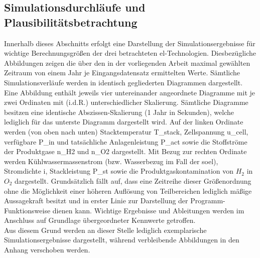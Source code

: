\documentclass[onecolumn,10pt,titlepage]{article}
\begin{document}
\subsection{Simulationsdurchläufe und Plausibilitätsbetrachtung}
Innerhalb dieses Abschnitts erfolgt eine Darstellung der Simulationsergebnisse für wichtige Berechnungsgrößen der drei betrachteten \gls{el}-Technologien. Diesbezügliche Abbildungen zeigen die über den in der vorliegenden Arbeit maximal gewählten Zeitraum von einem Jahr je Eingangsdatensatz ermittelten Werte. %
Sämtliche Simulationsverläufe werden in identisch gegliederten Diagrammen dargestellt. Eine Abbildung enthält jeweils vier untereinander angeordnete Diagramme mit je zwei Ordinaten mit (i.d.R.) unterschiedlicher Skalierung. Sämtliche Diagramme besitzen eine identische Abszissen-Skalierung (1 Jahr in Sekunden), welche lediglich für das unterste Diagramm dargestellt wird. Auf der linken Ordinate werden (von oben nach unten) Stacktemperatur \gls{T_stack}, Zellspannung \gls{u_cell}, verfügbare \gls{P_in} und tatsächliche Anlagenleistung \gls{P_act} sowie die Stoffströme der Produktgase \gls{n_H2} und \gls{n_O2} dargestellt.
Mit Bezug zur rechten Ordinate werden Kühlwassermassenstrom (bzw. Wasserbezug im Fall der \gls{soel}), Stromdichte \gls{i}, Stackleistung \gls{P_st} sowie die Produktgaskontamination von $H_2$ in $O_2$ dargestellt.
Grundsätzlich fällt auf, dass eine Zeitreihe dieser Größenordnung ohne die Möglichkeit einer höheren Auflösung von Teilbereichen lediglich mäßige Aussagekraft besitzt und in erster Linie zur Darstellung der Programm-Funktionsweise dienen kann. Wichtige Ergebnisse und Ableitungen werden im Anschluss auf Grundlage übergeordneter Kennwerte getroffen.\\ %
Aus diesem Grund werden an dieser Stelle lediglich exemplarische Simulationsergebnisse dargestellt, während verbleibende Abbildungen in den Anhang verschoben werden.
\end{document}
